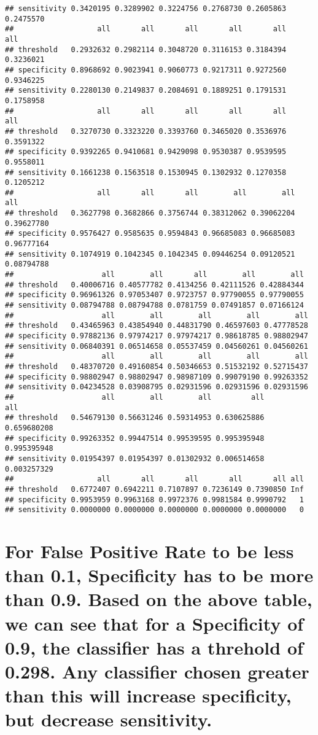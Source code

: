 \documentclass[]{article}
\begin{document}
\begin{verbatim}
## sensitivity 0.3420195 0.3289902 0.3224756 0.2768730 0.2605863 0.2475570
##                   all       all       all       all       all       all
## threshold   0.2932632 0.2982114 0.3048720 0.3116153 0.3184394 0.3236021
## specificity 0.8968692 0.9023941 0.9060773 0.9217311 0.9272560 0.9346225
## sensitivity 0.2280130 0.2149837 0.2084691 0.1889251 0.1791531 0.1758958
##                   all       all       all       all       all       all
## threshold   0.3270730 0.3323220 0.3393760 0.3465020 0.3536976 0.3591322
## specificity 0.9392265 0.9410681 0.9429098 0.9530387 0.9539595 0.9558011
## sensitivity 0.1661238 0.1563518 0.1530945 0.1302932 0.1270358 0.1205212
##                   all       all       all        all        all        all
## threshold   0.3627798 0.3682866 0.3756744 0.38312062 0.39062204 0.39627780
## specificity 0.9576427 0.9585635 0.9594843 0.96685083 0.96685083 0.96777164
## sensitivity 0.1074919 0.1042345 0.1042345 0.09446254 0.09120521 0.08794788
##                    all        all       all        all        all
## threshold   0.40006716 0.40577782 0.4134256 0.42111526 0.42884344
## specificity 0.96961326 0.97053407 0.9723757 0.97790055 0.97790055
## sensitivity 0.08794788 0.08794788 0.0781759 0.07491857 0.07166124
##                    all        all        all        all        all
## threshold   0.43465963 0.43854940 0.44831790 0.46597603 0.47778528
## specificity 0.97882136 0.97974217 0.97974217 0.98618785 0.98802947
## sensitivity 0.06840391 0.06514658 0.05537459 0.04560261 0.04560261
##                    all        all        all        all        all
## threshold   0.48370720 0.49160854 0.50346653 0.51532192 0.52715437
## specificity 0.98802947 0.98802947 0.98987109 0.99079190 0.99263352
## sensitivity 0.04234528 0.03908795 0.02931596 0.02931596 0.02931596
##                    all        all        all         all         all
## threshold   0.54679130 0.56631246 0.59314953 0.630625886 0.659680208
## specificity 0.99263352 0.99447514 0.99539595 0.995395948 0.995395948
## sensitivity 0.01954397 0.01954397 0.01302932 0.006514658 0.003257329
##                   all       all       all       all       all all
## threshold   0.6772407 0.6942211 0.7107897 0.7236149 0.7390850 Inf
## specificity 0.9953959 0.9963168 0.9972376 0.9981584 0.9990792   1
## sensitivity 0.0000000 0.0000000 0.0000000 0.0000000 0.0000000   0
\end{verbatim}

\section{For False Positive Rate to be less than 0.1, Specificity has to
be more than 0.9. Based on the above table, we can see that for a
Specificity of 0.9, the classifier has a threhold of 0.298. Any
classifier chosen greater than this will increase specificity, but
decrease
sensitivity.}\label{for-false-positive-rate-to-be-less-than-0.1-specificity-has-to-be-more-than-0.9.-based-on-the-above-table-we-can-see-that-for-a-specificity-of-0.9-the-classifier-has-a-threhold-of-0.298.-any-classifier-chosen-greater-than-this-will-increase-specificity-but-decrease-sensitivity.}
\end{document}
